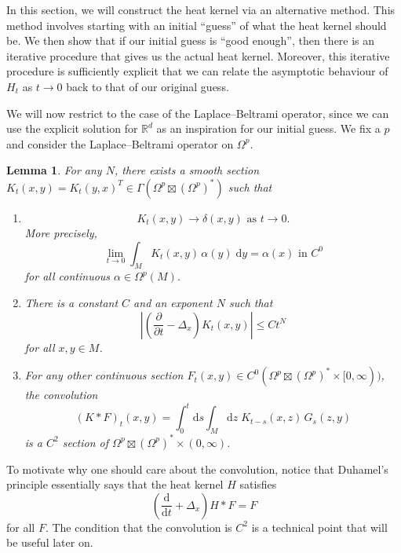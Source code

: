 \documentclass{shortart}
\newtheorem{lemma}[thm]{Lemma}
\theoremstyle{definition}
\newcommand\R{\mathbb{R}}
\renewcommand\d{\mathrm{d}}
\begin{document}
In this section, we will construct the heat kernel via an alternative method. This method involves starting with an initial ``guess'' of what the heat kernel should be. We then show that if our initial guess is ``good enough'', then there is an iterative procedure that gives us the actual heat kernel. Moreover, this iterative procedure is sufficiently explicit that we can relate the asymptotic behaviour of $H_t$ as $t \to 0$ back to that of our original guess.

We will now restrict to the case of the Laplace--Beltrami operator, since we can use the explicit solution for $\R^d$ as an inspiration for our initial guess. We fix a $p$ and consider the Laplace--Beltrami operator on $\Omega^p$.

\begin{lemma}\label{lemma:approximate-kernel}
  For any $N$, there exists a smooth section $K_t(x, y) = K_t(y, x)^T \in \Gamma(\Omega^p \boxtimes (\Omega^p)^*)$ such that
  \begin{enumerate}
    \item 
      \[
        K_t(x, y) \to \delta(x, y)\text{ as }t \to 0.
      \]
      More precisely, 
      \[
        \lim_{t \to 0} \int_M K_t(x, y)\, \alpha(y)\;\d y = \alpha(x)\text{ in }C^0
      \]
      for all continuous $\alpha \in \Omega^p(M)$.
    \item There is a constant $C$ and an exponent $N$ such that
      \[
        \left|\left(\frac{\partial}{\partial t} - \Delta_x\right) K_t(x, y)\right| \leq C t^N
      \]
      for all $x, y \in M$.
    \item For any other continuous section $F_t(x, y) \in C^0(\Omega^p \boxtimes (\Omega^p)^* \times [0, \infty))$, the convolution
      \[
        (K * F)_t(x, y) = \int_0^t \d s\int_M \d z\; K_{t - s} (x, z)\, G_s(z, y)
      \]
      is a $C^2$ section of $\Omega^p \boxtimes (\Omega^p)^* \times (0, \infty)$.
  \end{enumerate}
\end{lemma}
To motivate why one should care about the convolution, notice that Duhamel's principle essentially says that the heat kernel $H$ satisfies
\[
  \left(\frac{\d}{\d t} + \Delta_x\right) H * F = F
\]
for all $F$. The condition that the convolution is $C^2$ is a technical point that will be useful later on.
\end{document}
